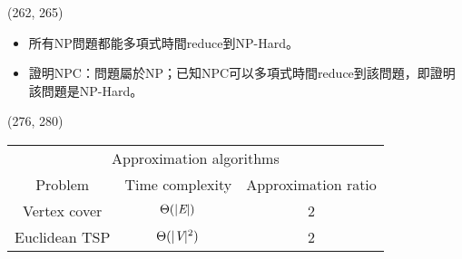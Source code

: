 \item \begin{theorem}{(262, 265)} \quad\quad
    \begin{itemize}
        \item 所有NP問題都能多項式時間reduce到NP-Hard。
        \item 證明NPC：問題屬於NP；已知NPC可以多項式時間reduce到該問題，即證明該問題是NP-Hard。
    \end{itemize}
\end{theorem}

\item \begin{theorem}{(276, 280)} \quad\quad
    \begin{table}[H]
        \centering
        \begin{tabular}{|c|c|c|}
            \hline
            \multicolumn{3}{|c|}{Approximation algorithms} \\
            \Xhline{3\arrayrulewidth}
            Problem & Time complexity & Approximation ratio \\
            \Xhline{2\arrayrulewidth}
            Vertex cover & $\Theta(|\textit{E}|)$ & 2 \\
            \hline
            Euclidean TSP & $\Theta(|\textit{V}|^2)$ & 2 \\
            \hline
        \end{tabular}
    \end{table}
\end{theorem}

